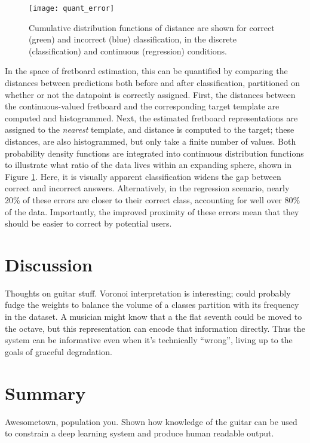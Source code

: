 \begin{figure}[t!]
  \centering
  \centerline{\texttt{[image: quant\_error]}}
\caption{Cumulative distribution functions of distance are shown for correct (green) and incorrect (blue) classification, in the discrete (classification) and continuous (regression) conditions.}
\label{fig:quant_error}
%
\end{figure}

In the space of fretboard estimation, this can be quantified by comparing the distances between predictions both before and after classification, partitioned on whether or not the datapoint is correctly assigned.
First, the distances between the continuous-valued fretboard and the corresponding target template are computed and histogrammed.
Next, the estimated fretboard representations are assigned to the \emph{nearest} template, and distance is computed to the target; these distances, are also histogrammed, but only take a finite number of values.
Both probability density functions are integrated into continuous distribution functions to illustrate what ratio of the data lives within an expanding sphere, shown in Figure \ref{fig:quant_error}.
Here, it is visually apparent classification widens the gap between correct and incorrect answers.
Alternatively, in the regression scenario, nearly 20\% of these errors are closer to their correct class, accounting for well over 80\% of the data.
Importantly, the improved proximity of these errors mean that they should be easier to correct by potential users.


\section{Discussion}

Thoughts on guitar stuff.
Voronoi interpretation is interesting; could probably fudge the weights to balance the volume of a classes partition with its frequency in the dataset.
A musician might know that a the flat seventh could be moved to the octave, but this representation can encode that information directly.
Thus the system can be informative even when it's technically ``wrong'', living up to the goals of graceful degradation.

\section{Summary}

Awesometown, population you.
Shown how knowledge of the guitar can be used to constrain a deep learning system and produce human readable output.
